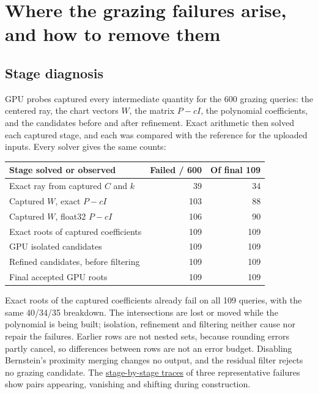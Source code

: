 \documentclass[11pt,a4paper]{article}
\begin{document}
\section{Where the grazing failures arise, and how to remove
them}\label{where-the-grazing-failures-arise-and-how-to-remove-them}

\subsection{Stage diagnosis}\label{stage-diagnosis}

GPU probes captured every intermediate quantity for the 600 grazing
queries: the centered ray, the chart vectors \(W\), the matrix \(P-cI\),
the polynomial coefficients, and the candidates before and after
refinement. Exact arithmetic then solved each captured stage, and each
was compared with the reference for the uploaded inputs. Every solver
gives the same counts:

{
\begin{minipage}{\linewidth}\centering\begin{tabular}{@{}lrr@{}}
\toprule\noalign{}
Stage solved or observed & Failed / 600 & Of final 109 \\
\midrule\noalign{}



Exact ray from captured \(C\) and \(k\) & 39 & 34 \\
Captured \(W\), exact \(P-cI\) & 103 & 88 \\
Captured \(W\), float32 \(P-cI\) & 106 & 90 \\
Exact roots of captured coefficients & 109 & 109 \\
GPU isolated candidates & 109 & 109 \\
Refined candidates, before filtering & 109 & 109 \\
Final accepted GPU roots & 109 & 109 \\
\bottomrule\end{tabular}\end{minipage}
}

Exact roots of the captured coefficients already fail on all 109
queries, with the same 40/34/35 breakdown. The intersections are lost or
moved while the polynomial is being built; isolation, refinement and
filtering neither cause nor repair the failures. Earlier rows are not
nested sets, because rounding errors partly cancel, so differences
between rows are not an error budget. Disabling Bernstein's proximity
merging changes no output, and the residual filter rejects no grazing
candidate. The
\href{https://github.com/tommyhax/hopf-observatory/blob/main/research/diagnostics/grazing/results/grazing-diagnostic.png}{stage-by-stage
traces} of three representative failures show pairs appearing, vanishing
and shifting during construction.
\end{document}
